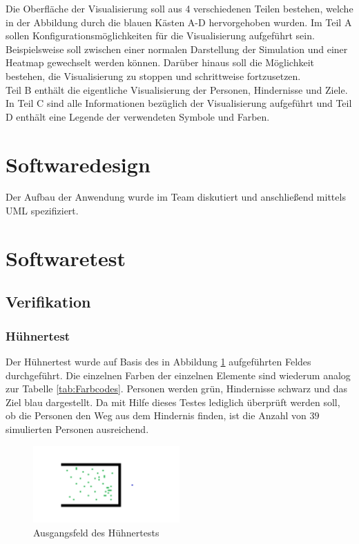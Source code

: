 Die Oberfläche der Visualisierung soll aus 4 verschiedenen Teilen bestehen, welche in der Abbildung durch die blauen Kästen A-D hervorgehoben wurden. Im Teil A sollen Konfigurationsmöglichkeiten für die Visualisierung aufgeführt sein. Beispielsweise soll zwischen einer normalen Darstellung der Simulation und einer Heatmap gewechselt werden können. Darüber hinaus soll die Möglichkeit bestehen, die Visualisierung zu stoppen und schrittweise fortzusetzen. \\
Teil B enthält die eigentliche Visualisierung der Personen, Hindernisse und Ziele. In Teil C sind alle Informationen bezüglich der Visualisierung aufgeführt und Teil D enthält eine Legende der verwendeten Symbole und Farben.

\section{Softwaredesign}

Der Aufbau der Anwendung wurde im Team diskutiert und anschließend mittels UML spezifiziert.


\section{Softwaretest}

\subsection{Verifikation}
\subsubsection{Hühnertest}
Der Hühnertest wurde auf Basis des in Abbildung \ref{fig:HühnertestMap} aufgeführten Feldes durchgeführt. Die einzelnen Farben der einzelnen Elemente sind wiederum analog zur Tabelle \ref{tab:Farbcodes}. Personen werden grün, Hindernisse schwarz und das Ziel blau dargestellt. Da mit Hilfe dieses Testes lediglich überprüft werden soll, ob die Personen den Weg aus dem Hindernis finden, ist die Anzahl von $39$ simulierten Personen ausreichend.  

\begin{figure}[htpb]
	\centering
	\includegraphics[width=0.5\textwidth]{abbildungen/HuehnertestMap.png}
	\caption{Ausgangsfeld des Hühnertests}
	\label{fig:HühnertestMap}
\end{figure}

